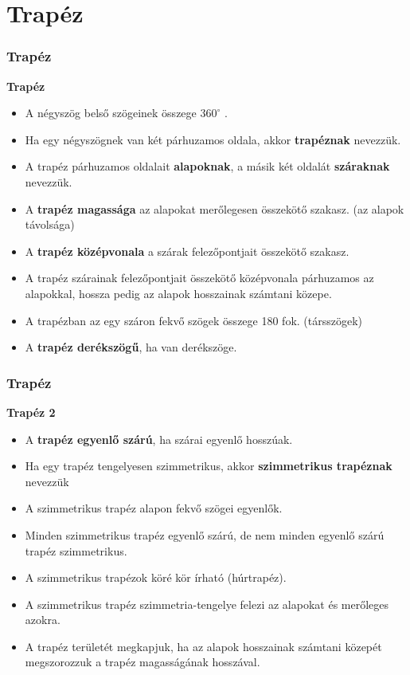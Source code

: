\documentclass[11pt]{beamer}
\begin{document}
\section{\textbf{Trapéz}}
\begin{frame}[<+->]
\frametitle{Trapéz}
\begin{block}{\textbf{Trapéz}}

\begin{itemize}[label=$\circ$]
\item A négyszög belső szögeinek összege $360^\circ$ .
\end{itemize}
\begin{itemize}[label=$\circ$]
\item Ha egy négyszögnek van két párhuzamos oldala, akkor \textbf{trapéznak} nevezzük.
\item A trapéz párhuzamos oldalait \textbf{alapoknak}, a másik két oldalát \textbf{száraknak} nevezzük.
\item A \textbf{trapéz magassága} az alapokat merőlegesen összekötő szakasz. (az alapok távolsága)
\item A \textbf{trapéz középvonala} a szárak felezőpontjait összekötő szakasz.
\item A trapéz szárainak felezőpontjait összekötő középvonala párhuzamos az alapokkal, hossza pedig az alapok hosszainak számtani közepe.
\item A trapézban az egy száron fekvő szögek összege 180 fok. (társszögek)
\item A \textbf{trapéz derékszögű}, ha van derékszöge.
\end{itemize}
\end{block}
\end{frame}

\begin{frame}[<+->]
\frametitle{Trapéz}
\begin{block}{\textbf{Trapéz 2}}
\begin{itemize}[label=$\circ$]
\item A \textbf{trapéz egyenlő szárú}, ha szárai egyenlő hosszúak.
\item Ha egy trapéz tengelyesen szimmetrikus, akkor \textbf{szimmetrikus trapéznak} nevezzük
\item A szimmetrikus trapéz alapon fekvő szögei egyenlők.
\item Minden szimmetrikus trapéz egyenlő szárú, de nem minden egyenlő szárú trapéz szimmetrikus.
\item A szimmetrikus trapézok köré kör írható (húrtrapéz).
\item A szimmetrikus trapéz szimmetria-tengelye felezi az alapokat és merőleges azokra.
\item A trapéz területét megkapjuk, ha az alapok hosszainak számtani közepét megszorozzuk a trapéz magasságának hosszával.
\end{itemize}
\end{block}
\end{frame}
\end{document}
